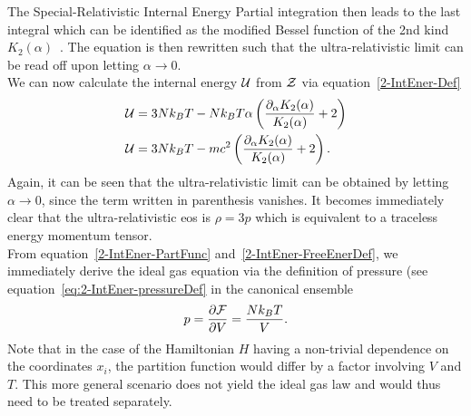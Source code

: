 \begin{subsection}{The Special-Relativistic Internal Energy}
Partial integration then leads to the last integral which can be identified as the modified Bessel function of the 2nd kind $K_2(\alpha)$~\cite{abramowitzPocketbookMathematicalFunctions1984}.
The equation is then rewritten such that the ultra-relativistic limit can be read off upon letting $\alpha\rightarrow0$.\\
We can now calculate the internal energy $\mathcal{U}$ from $\mathcal{Z}$ via equation~\eqref{2-IntEner-Def}
\begin{align}
    \mathcal{U} &= 3Nk_B T - Nk_B T\alpha\left(\frac{\partial_\alpha K_2(\alpha)}{K_2(\alpha)}+2\right)\\
    \mathcal{U} &= 3Nk_B T - mc^2\left(\frac{\partial_\alpha K_2(\alpha)}{K_2(\alpha)}+2\right).
    \label{2-IntEner-InternelEnergyExplicit}
\end{align}
Again, it can be seen that the ultra-relativistic limit can be obtained by letting $\alpha\rightarrow0$, since the term written in parenthesis vanishes.
It becomes immediately clear that the ultra-relativistic \ac{eos} is $\rho=3p$ which is equivalent to a traceless energy momentum tensor.\\
From equation~\eqref{2-IntEner-PartFunc} and~\eqref{2-IntEner-FreeEnerDef}, we immediately derive the ideal gas equation via the definition of pressure (see equation~\eqref{eq:2-IntEner-pressureDef} in the canonical ensemble
\begin{equation}
    p=\frac{\partial\mathcal{F}}{\partial V} = \frac{Nk_ BT}{V}.
    \label{eq:2-IntEner-IdealGasEq}
\end{equation}
Note that in the case of the Hamiltonian $H$ having a non-trivial dependence on the coordinates $x_i$, the partition function would differ by a factor involving $V$ and $T$.
This more general scenario does not yield the ideal gas law and would thus need to be treated separately.
\end{subsection}
%
%
%
